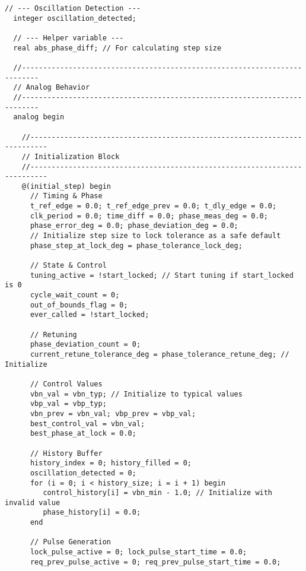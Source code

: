 \begin{lstlisting}[caption={Verilog-A Generic Vb Tuner Implementation}]
  // --- Oscillation Detection ---
  integer oscillation_detected;

  // --- Helper variable ---
  real abs_phase_diff; // For calculating step size

  //--------------------------------------------------------------------------
  // Analog Behavior
  //--------------------------------------------------------------------------
  analog begin

    //--------------------------------------------------------------------------
    // Initialization Block
    //--------------------------------------------------------------------------
    @(initial_step) begin
      // Timing & Phase
      t_ref_edge = 0.0; t_ref_edge_prev = 0.0; t_dly_edge = 0.0;
      clk_period = 0.0; time_diff = 0.0; phase_meas_deg = 0.0;
      phase_error_deg = 0.0; phase_deviation_deg = 0.0;
      // Initialize step size to lock tolerance as a safe default
      phase_step_at_lock_deg = phase_tolerance_lock_deg;

      // State & Control
      tuning_active = !start_locked; // Start tuning if start_locked is 0
      cycle_wait_count = 0;
      out_of_bounds_flag = 0;
      ever_called = !start_locked;

      // Retuning
      phase_deviation_count = 0;
      current_retune_tolerance_deg = phase_tolerance_retune_deg; // Initialize

      // Control Values
      vbn_val = vbn_typ; // Initialize to typical values
      vbp_val = vbp_typ;
      vbn_prev = vbn_val; vbp_prev = vbp_val;
      best_control_val = vbn_val;
      best_phase_at_lock = 0.0;

      // History Buffer
      history_index = 0; history_filled = 0;
      oscillation_detected = 0;
      for (i = 0; i < history_size; i = i + 1) begin
         control_history[i] = vbn_min - 1.0; // Initialize with invalid value
         phase_history[i] = 0.0;
      end

      // Pulse Generation
      lock_pulse_active = 0; lock_pulse_start_time = 0.0;
      req_prev_pulse_active = 0; req_prev_pulse_start_time = 0.0;


\end{lstlisting}
